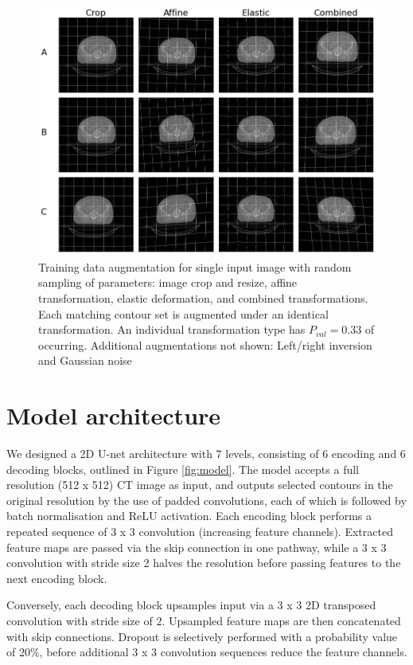 \begin{figure}[!htb]
	\begin{center}
		\includegraphics[width=1\textwidth]{figures/augment}
		\caption{Training data augmentation for single input image with random sampling of parameters: image crop and resize, affine transformation, elastic deformation, and combined transformations. Each matching contour set is augmented under an identical transformation. An individual transformation type has $P_{val}=0.33$ of occurring. Additional augmentations not shown: Left/right inversion and Gaussian noise}
		\label{fig:augment}
	\end{center}
\end{figure}

\section{Model architecture}
\label{ch:method-architecture}
We designed a 2D U-net architecture with 7 levels, consisting of 6 encoding and 6 decoding blocks, outlined in Figure \ref{fig:model}. The model accepts a full resolution (512 x 512) CT image as input, and outputs selected contours in the original resolution by the use of padded convolutions, each of which is followed by batch normalisation and ReLU activation. Each encoding block performs a repeated sequence of 3 x 3 convolution (increasing feature channels). Extracted feature maps are passed via the skip connection in one pathway, while a 3 x 3 convolution with stride size 2 halves the resolution before passing features to the next encoding block.

Conversely, each decoding block upsamples input via a 3 x 3 2D transposed convolution with stride size of 2. Upsampled feature maps are then concatenated with skip connections. Dropout is selectively performed with a probability value of 20\%, before additional 3 x 3 convolution sequences reduce the feature channels.

